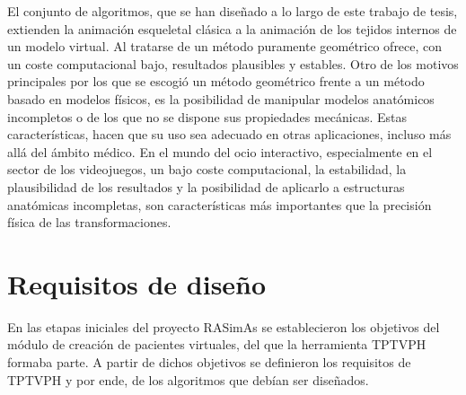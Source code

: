 El conjunto de algoritmos, que se han diseñado a lo largo de este trabajo de tesis, extienden la animación esqueletal clásica a la animación de los tejidos internos de un modelo virtual. Al tratarse de un método puramente geométrico ofrece, con un coste computacional bajo, resultados plausibles y estables. Otro de los motivos principales por los que se escogió un método geométrico frente a un método basado en modelos físicos, es la posibilidad de manipular modelos anatómicos incompletos o de los que no se dispone sus propiedades mecánicas. Estas características, hacen que su uso sea adecuado en otras aplicaciones, incluso más allá del ámbito médico.  En el mundo del ocio interactivo, especialmente en el sector de los videojuegos, un bajo coste computacional, la estabilidad, la plausibilidad de los resultados y la posibilidad de aplicarlo a estructuras anatómicas incompletas,  son características más importantes que la precisión física de las transformaciones. 


\section{Requisitos de diseño}
\label{posing:req}

En las etapas iniciales del proyecto \ac{RASimAs} se establecieron los objetivos del módulo de creación de pacientes virtuales, del que la herramienta \ac{TPTVPH} formaba parte. A partir de dichos objetivos se definieron los requisitos de \ac{TPTVPH} y por ende, de los algoritmos que debían  ser diseñados.


